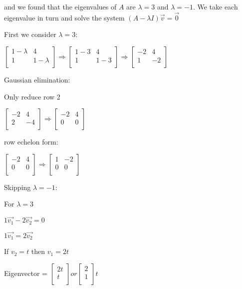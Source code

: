 \documentclass{extarticle}
\begin{document}
and we found that the eigenvalues of $A$ are $\lambda=3$ and $\lambda=-1$. We take each eigenvalue in turn and solve the system $\left(A-\lambda I\right)\vec{v}=\vec{0}$

First we consider $\lambda=3$:

$\left[\begin{matrix}1-\lambda&4\\1&1-\lambda\\\end{matrix}\right]\Rightarrow\left[\begin{matrix}1-3&4\\1&1-3\\\end{matrix}\right]\Rightarrow\left[\begin{matrix}-2&4\\1&-2\\\end{matrix}\right]$

Gaussian elimination:

Only reduce row 2

$\left[\begin{matrix}-2&4\\2&-4\\\end{matrix}\right]\Rightarrow\left[\begin{matrix}-2&4\\0&0\\\end{matrix}\right]$

row echelon form:

$\left[\begin{matrix}-2&4\\0&0\\\end{matrix}\right]\Rightarrow\left[\begin{matrix}1&-2\\0&0\\\end{matrix}\right]$

Skipping $\lambda=-1$:

For $\lambda=3$

$1\vec{v_1}-2\vec{v_2}=0$

$1\vec{v_1}=2\vec{v_2}$

If $v_2=t$ then $v_1=2t$

Eigenvector = $\left[\begin{matrix}2t\\t\\\end{matrix}\right] or \left[\begin{matrix}2\\1\\\end{matrix}\right]t$
\end{document}
